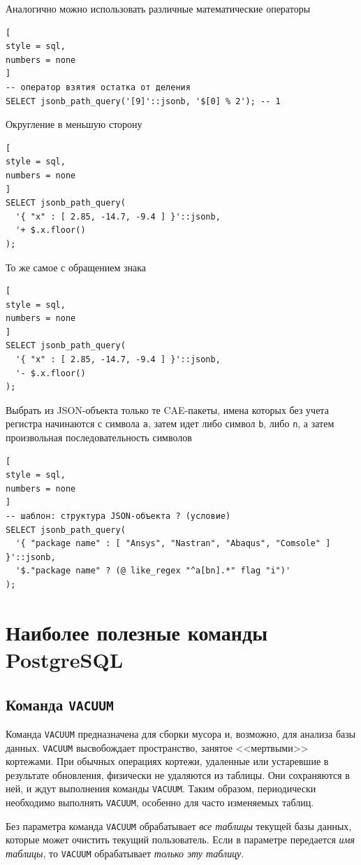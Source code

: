 \documentclass[%
	11pt,
	a4paper,
	utf8,
		]{article}
\begin{document}
Аналогично можно использовать различные математические операторы
\begin{lstlisting}[
style = sql, 
numbers = none
]
-- оператор взятия остатка от деления
SELECT jsonb_path_query('[9]'::jsonb, '$[0] % 2'); -- 1
\end{lstlisting}

Округление в меньшую сторону
\begin{lstlisting}[
style = sql,
numbers = none
]
SELECT jsonb_path_query(
  '{ "x" : [ 2.85, -14.7, -9.4 ] }'::jsonb,
  '+ $.x.floor()
);
\end{lstlisting}

То же самое с обращением знака
\begin{lstlisting}[
style = sql,
numbers = none
]
SELECT jsonb_path_query(
  '{ "x" : [ 2.85, -14.7, -9.4 ] }'::jsonb,
  '- $.x.floor()
);
\end{lstlisting}

Выбрать из JSON-объекта только те CAE-пакеты, имена которых без учета регистра начинаются с символа \texttt{a}, затем идет либо символ \texttt{b}, либо \texttt{n}, а затем произвольная последовательность символов
\begin{lstlisting}[
style = sql,
numbers = none
]
-- шаблон: структура JSON-объекта ? (условие)
SELECT jsonb_path_query(
  '{ "package name" : [ "Ansys", "Nastran", "Abaqus", "Comsole" ] }'::jsonb,
  '$."package name" ? (@ like_regex "^a[bn].*" flag "i")'
);
\end{lstlisting}



\section{Наиболее полезные команды PostgreSQL}

\subsection{Команда \texttt{VACUUM}}

Команда \texttt{VACUUM} предназначена для сборки мусора и, возможно, для анализа базы данных. \texttt{VACUUM} высвобождает пространство, занятое <<мертвыми>> кортежами. При обычных операциях кортежи, удаленные или устаревшие в результате обновления, физически не удаляются из таблицы. Они сохраняются в ней, и ждут выполнения команды \texttt{VACUUM}. Таким образом, периодически необходимо выполнять \texttt{VACUUM}, особенно для часто изменяемых таблиц.

Без параметра команда \texttt{VACUUM} обрабатывает \emph{все таблицы} текущей базы данных, которые может очистить текущий пользователь. Если в параметре передается \emph{имя таблицы}, то \texttt{VACUUM} обрабатывает \emph{только эту таблицу}.
\end{document}
